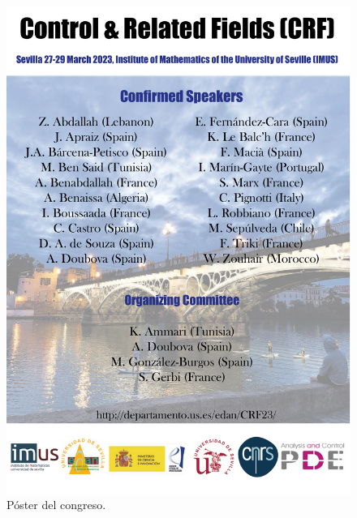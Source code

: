 \documentclass[twoside]{article}
\begin{document}
\begin{figure}[h!]
\centering
\includegraphics[width=0.99\linewidth]{images/posterCRF23}
\caption{Póster del congreso.}
\end{figure}
\end{document}
